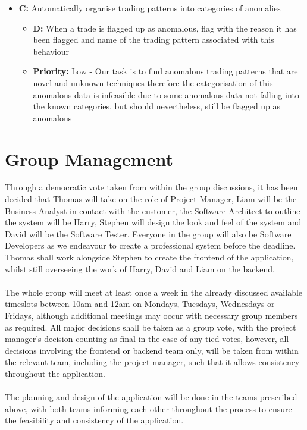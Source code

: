 \documentclass[11pt, oneside, a4paper]{article}
\begin{document}
\begin{itemize}
\begin{itemize}
	\end{itemize}
	\item \textbf{C:} Automatically organise trading patterns into categories of anomalies
	\begin{itemize}
		\item \textbf{D:} When a trade is flagged up as anomalous, flag with the reason it has been flagged and name of the trading pattern associated with this behaviour
		\item \textbf{Priority:} Low - Our task is to find anomalous trading patterns that are novel and unknown techniques therefore the categorisation of this anomalous data is infeasible due to some anomalous data not falling into the known categories, but should nevertheless, still be flagged up as anomalous
	\end{itemize}
\end{itemize}

\section{Group Management}
Through a democratic vote taken from within the group discussions, it has been decided that Thomas will take on the role of
Project Manager, Liam will be the Business Analyst in contact with the customer, the Software Architect to outline the system
will be Harry, Stephen will design the look and feel of the system and David will be the Software Tester. Everyone in the group
will also be Software Developers as we endeavour to create a professional system before the deadline. Thomas shall work alongside
Stephen to create the frontend of the application, whilst still overseeing the work of Harry, David and Liam on the backend. \\\\
The whole group will meet at least once a week in the already discussed available timeslots between 10am and 12am on Mondays, Tuesdays,
Wednesdays or Fridays, although additional meetings may occur with necessary group members as required. All major decisions shall
be taken as a group vote, with the project manager's decision counting as final in the case of any tied votes, however, all decisions
involving the frontend or backend team only, will be taken from within the relevant team, including the project manager, such that it
allows consistency throughout the application.\\\\
The planning and design of the application will be done in the teams prescribed above, with both teams informing each other throughout
the process to ensure the feasibility and consistency of the application.
\end{document}
